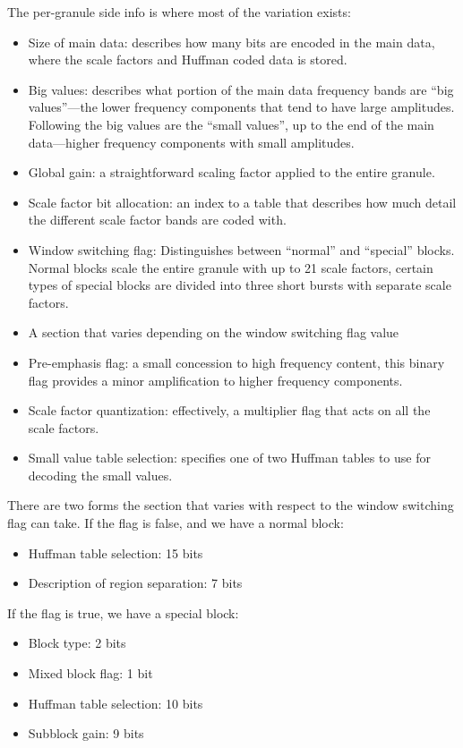 \documentclass{thesis}
\begin{document}
	The per-granule side info is where most of the variation exists:
	
\begin{itemize}
	\item Size of main data: describes how many bits are encoded in the main data, where the scale factors and Huffman coded data is stored.
	\item Big values: describes what portion of the main data frequency bands are ``big values''---the lower frequency components that tend to have large amplitudes. Following the big values are the ``small values'', up to the end of the main data---higher frequency components with small amplitudes.
	\item Global gain: a straightforward scaling factor applied to the entire granule.
	\item Scale factor bit allocation: an index to a table that describes how much detail the different scale factor bands are coded with.
	\item Window switching flag: Distinguishes between ``normal'' and ``special'' blocks. Normal blocks scale the entire granule with up to 21 scale factors, certain types of special blocks are divided into three short bursts with separate scale factors.
	\item A section that varies depending on the window switching flag value
	\item Pre-emphasis flag: a small concession to high frequency content, this binary flag provides a minor amplification to higher frequency components.
	\item Scale factor quantization: effectively, a multiplier flag that acts on all the scale factors.
	\item Small value table selection: specifies one of two Huffman tables to use for decoding the small values.
\end{itemize}

	There are two forms the section that varies with respect to the window switching flag can take. If the flag is false, and we have a normal block:
	
\begin{itemize}
	\item Huffman table selection: 15 bits
	\item Description of region separation: 7 bits
\end{itemize}

	If the flag is true, we have a special block:
	
\begin{itemize}
	\item Block type: 2 bits
	\item Mixed block flag: 1 bit
	\item Huffman table selection: 10 bits
	\item Subblock gain: 9 bits
\end{itemize}
\end{document}
